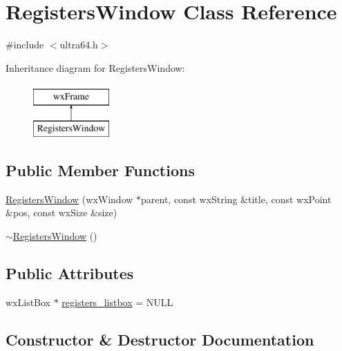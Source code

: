 \hypertarget{class_registers_window}{}\section{Registers\+Window Class Reference}
\label{class_registers_window}


{\ttfamily \#include $<$ultra64.\+h$>$}

Inheritance diagram for Registers\+Window\+:\begin{figure}[H]
\begin{center}
\leavevmode
\includegraphics[height=2.000000cm]{class_registers_window}
\end{center}
\end{figure}
\subsection*{Public Member Functions}
\begin{DoxyCompactItemize}
\item 
\hyperlink{class_registers_window_a20e575990b7951158b38189730288421}{Registers\+Window} (wx\+Window $\ast$parent, const wx\+String \&title, const wx\+Point \&pos, const wx\+Size \&size)
\item 
\hyperlink{class_registers_window_a8218bf9cb1730e750c4c9ce8c6b92cfb}{$\sim$\+Registers\+Window} ()
\end{DoxyCompactItemize}
\subsection*{Public Attributes}
\begin{DoxyCompactItemize}
\item 
wx\+List\+Box $\ast$ \hyperlink{class_registers_window_a5d8baf6bde30c9782d102ed64816a3b3}{registers\+\_\+listbox} = N\+U\+LL
\end{DoxyCompactItemize}


\subsection{Constructor \& Destructor Documentation}
\mbox{\label{class_registers_window_a20e575990b7951158b38189730288421}} 
